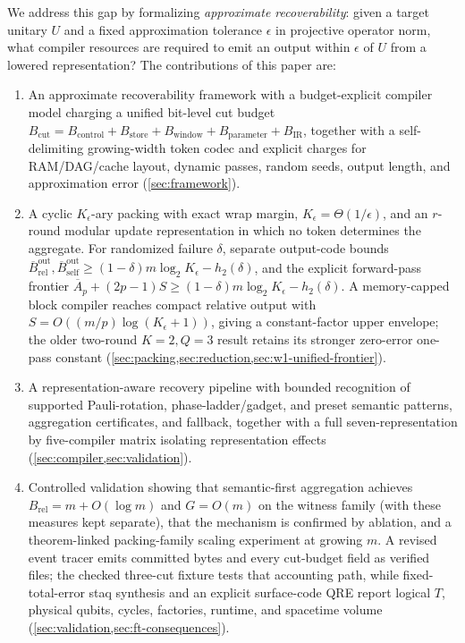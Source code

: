 \documentclass[aps,prx,reprint,floatfix,superscriptaddress]{revtex4-2}
\begin{document}
We address this gap by formalizing \emph{approximate recoverability}:
given a target unitary $U$ and a fixed approximation tolerance $\epsilon$
in projective operator norm, what compiler resources are required to emit
an output within $\epsilon$ of $U$ from a lowered representation? The
contributions of this paper are:
\begin{enumerate}[leftmargin=1.5em]
    \item An approximate recoverability framework with a budget-explicit
    compiler model charging a unified bit-level cut budget
    $B_{\mathrm{cut}}=B_{\mathrm{control}}+B_{\mathrm{store}}+
    B_{\mathrm{window}}+B_{\mathrm{parameter}}+B_{\mathrm{IR}}$, together
    with a self-delimiting growing-width token codec and explicit charges
    for RAM/DAG/cache layout, dynamic passes, random seeds, output length,
    and approximation error
    (\cref{sec:framework}).
    \item A cyclic $K_\epsilon$-ary packing with exact wrap margin,
    $K_\epsilon=\Theta(1/\epsilon)$, and an $r$-round modular update
    representation in which no token determines the aggregate.  For
    randomized failure $\delta$, separate output-code bounds
    $\overline B_{\mathrm{rel}}^{\mathrm{out}},
    \overline B_{\mathrm{self}}^{\mathrm{out}}
    \geq(1-\delta)m\log_2K_\epsilon-h_2(\delta)$, and the explicit
    forward-pass frontier
    $\overline A_p+(2p-1)S\geq
    (1-\delta)m\log_2K_\epsilon-h_2(\delta)$.  A memory-capped block
    compiler reaches compact relative output with
    $S=O((m/p)\log(K_\epsilon+1))$, giving a constant-factor upper
    envelope; the older two-round $K=2,Q=3$ result retains its stronger
    zero-error one-pass constant
    (\cref{sec:packing,sec:reduction,sec:w1-unified-frontier}).
    \item A representation-aware recovery pipeline with bounded recognition
    of supported Pauli-rotation, phase-ladder/gadget, and preset semantic
    patterns, aggregation certificates, and fallback, together
    with a full seven-representation by five-compiler matrix isolating
    representation effects (\cref{sec:compiler,sec:validation}).
    \item Controlled validation showing that semantic-first aggregation
    achieves $B_{\mathrm{rel}}=m+O(\log m)$ and $G=O(m)$ on the witness
    family (with these measures kept separate), that the mechanism is confirmed by
    ablation, and a theorem-linked packing-family scaling experiment at
    growing $m$.  A revised event tracer emits committed bytes and every
    cut-budget field as verified files; the checked three-cut fixture tests
    that accounting path, while fixed-total-error staq synthesis and an explicit
    surface-code QRE report logical $T$, physical qubits, cycles, factories,
    runtime, and spacetime volume (\cref{sec:validation,sec:ft-consequences}).
\end{enumerate}
\end{document}
